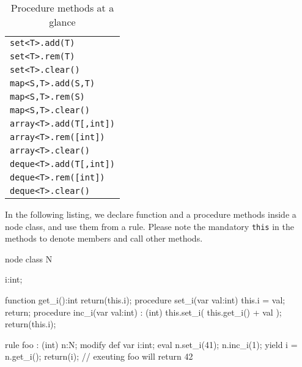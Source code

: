 \begin{table}[htbp]
\centering
\begin{tabular}{|l|}
\hline
\texttt{set<T>.add(T)}\\
\texttt{set<T>.rem(T)}\\
\texttt{set<T>.clear()}\\
\hline
\texttt{map<S,T>.add(S,T)}\\
\texttt{map<S,T>.rem(S)}\\
\texttt{map<S,T>.clear()}\\
\hline
\texttt{array<T>.add(T[,int])}\\
\texttt{array<T>.rem([int])}\\
\texttt{array<T>.clear()}\\
\hline
\texttt{deque<T>.add(T[,int])}\\
\texttt{deque<T>.rem([int])}\\
\texttt{deque<T>.clear()}\\
\hline
\end{tabular}
\caption{Procedure methods at a glance}
\label{procmethstab}
\end{table}


\begin{example}
In the following listing, we declare function and a procedure methods inside a node class, and use them from a rule.
Please note the mandatory \texttt{this} in the methods to denote members and call other methods.
	\begin{grgen}
node class N
{
	i:int;
	
	function get_i():int
	{
		return(this.i);
	}
	procedure set_i(var val:int)
	{
		this.i = val;
		return;
	}
	procedure inc_i(var val:int) : (int)
	{
		this.set_i( this.get_i() + val );
		return(this.i);
	}
}

rule foo : (int)
{
	n:N;
	modify {
		def var i:int;
		eval {
			n.set_i(41);
			n.inc_i(1);
			yield i = n.get_i();
		}
		return(i); // exeuting foo will return 42
	}
}
	\end{grgen}
\end{example}


